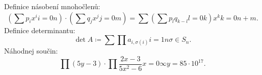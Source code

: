 \documentclass[a4paper,11pt]{article}
\begin{document}
 Definice násobení mnohočlenů:
 \[
  \left( \sum{p_ix^{i}}{i=0}{n} \right) \cdot \left( \sum{q_jx^{j}}{j=0}{m}
  \right) = \sum{\left(\sum{p_lq_{k-l}}{l=0}{k}\right)x^{k}}{k=0}{n+m}.
 \]
 Definice determinantu:
 \[
  \det A \coloneqq \sum{\prod{a_{i,\sigma(i)}}{i=1}{n}}{\sigma \in S_n}{}.
 \]
 Náhodnej součin:
 \[
  \prod{(5y-3) \cdot \prod{\frac{2x-3}{5x^2 - 6}}{x=0}{\infty}}{y=8}{5 \cdot
  10^{17}}.
 \]
\end{document}
